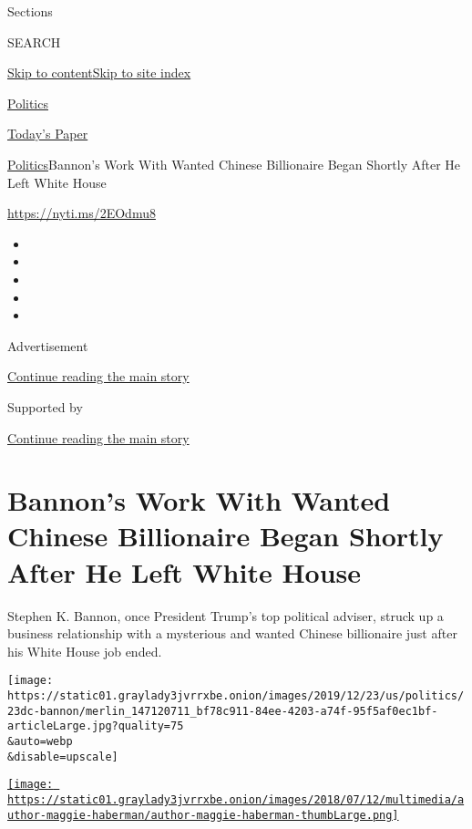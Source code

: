 Sections

SEARCH

\protect\hyperlink{site-content}{Skip to
content}\protect\hyperlink{site-index}{Skip to site index}

\href{https://www.nytimes3xbfgragh.onion/section/politics}{Politics}

\href{https://myaccount.nytimes3xbfgragh.onion/auth/login?response_type=cookie\&client_id=vi}{}

\href{https://www.nytimes3xbfgragh.onion/section/todayspaper}{Today's
Paper}

\href{/section/politics}{Politics}\textbar{}Bannon's Work With Wanted
Chinese Billionaire Began Shortly After He Left White House

\url{https://nyti.ms/2EOdmu8}

\begin{itemize}
\item
\item
\item
\item
\item
\end{itemize}

Advertisement

\protect\hyperlink{after-top}{Continue reading the main story}

Supported by

\protect\hyperlink{after-sponsor}{Continue reading the main story}

\hypertarget{bannons-work-with-wanted-chinese-billionaire-began-shortly-after-he-left-white-house}{%
\section{Bannon's Work With Wanted Chinese Billionaire Began Shortly
After He Left White
House}\label{bannons-work-with-wanted-chinese-billionaire-began-shortly-after-he-left-white-house}}

Stephen K. Bannon, once President Trump's top political adviser, struck
up a business relationship with a mysterious and wanted Chinese
billionaire just after his White House job ended.

\texttt{[image: https://static01.graylady3jvrrxbe.onion/images/2019/12/23/us/politics/23dc-bannon/merlin\_147120711\_bf78c911-84ee-4203-a74f-95f5af0ec1bf-articleLarge.jpg?quality=75\\\&auto=webp\\\&disable=upscale]}

\href{https://www.nytimes3xbfgragh.onion/by/maggie-haberman}{\texttt{[image: https://static01.graylady3jvrrxbe.onion/images/2018/07/12/multimedia/author-maggie-haberman/author-maggie-haberman-thumbLarge.png]}}


